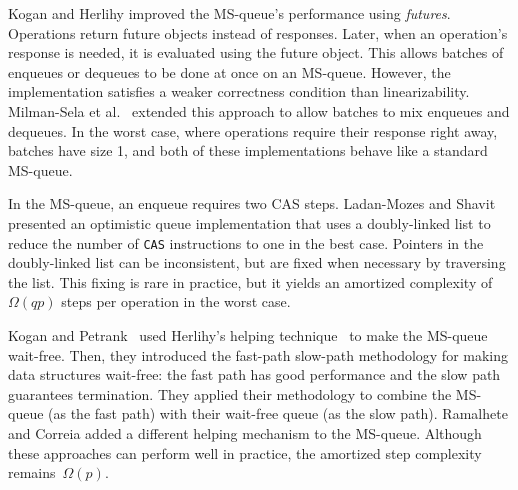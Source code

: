 Kogan and Herlihy \cite{DBLP:conf/podc/KoganH14} improved the MS-queue's performance using \emph{futures}.
Operations return future
objects instead of responses. Later, when an operation's response is needed, it
is evaluated using the future object.
This allows batches of enqueues or dequeues to be done at once on an MS-queue.
However, the implementation satisfies a weaker correctness condition than linearizability.
Milman-Sela et al.~\cite{MKLLP22} extended this approach to allow batches
to mix enqueues and dequeues.
In the worst case, where operations require their response right away,
batches have size 1, and both of these implementations behave like a standard MS-queue.

In the MS-queue, an enqueue requires two CAS steps.
Ladan-Mozes and Shavit~\cite{DBLP:journals/dc/Ladan-MozesS08}
presented an optimistic  queue implementation
that uses a doubly-linked list to reduce the number of
\texttt{CAS} instructions to one in the best case. 
Pointers in the doubly-linked list can be inconsistent, but are fixed when necessary by traversing the list.
This fixing is rare in practice, but it yields an amortized complexity of $\Omega(qp)$ 
steps per operation in the worst case.

Kogan and Petrank~\cite{DBLP:conf/ppopp/KoganP11} 
used Herlihy's helping
technique~\cite{10.1145/114005.102808} to make the MS-queue
wait-free.
Then, they introduced the 
fast-path slow-path methodology \cite{10.1145/2370036.2145835} for making data structures wait-free:
the fast path has good performance and the slow path guarantees termination.
They applied their methodology to combine the MS-queue (as the fast path)
with their wait-free queue (as the slow path).
Ramalhete and Correia \cite{RC17} added a different helping mechanism to the MS-queue.
Although these approaches can perform well in practice,
the amortized step complexity remains~$\Omega(p)$. 

